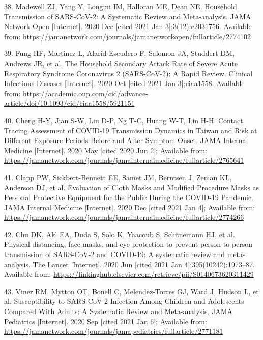 \documentclass[
]{article}
\begin{document}
\leavevmode\hypertarget{ref-madewell_household_2020}{}%
38. Madewell ZJ, Yang Y, Longini IM, Halloran ME, Dean NE. Household
Transmission of SARS-CoV-2: A Systematic Review and Meta-analysis. JAMA
Network Open {[}Internet{]}. 2020 Dec {[}cited 2021 Jan
3{]};3(12):e2031756. Available from:
\url{https://jamanetwork.com/journals/jamanetworkopen/fullarticle/2774102}

\leavevmode\hypertarget{ref-fung_household_2020}{}%
39. Fung HF, Martinez L, Alarid-Escudero F, Salomon JA, Studdert DM,
Andrews JR, et al. The Household Secondary Attack Rate of Severe Acute
Respiratory Syndrome Coronavirus 2 (SARS-CoV-2): A Rapid Review.
Clinical Infectious Diseases {[}Internet{]}. 2020 Oct {[}cited 2021 Jan
3{]};ciaa1558. Available from:
\url{https://academic.oup.com/cid/advance-article/doi/10.1093/cid/ciaa1558/5921151}

\leavevmode\hypertarget{ref-cheng_contact_2020}{}%
40. Cheng H-Y, Jian S-W, Liu D-P, Ng T-C, Huang W-T, Lin H-H. Contact
Tracing Assessment of COVID-19 Transmission Dynamics in Taiwan and Risk
at Different Exposure Periods Before and After Symptom Onset. JAMA
Internal Medicine {[}Internet{]}. 2020 May {[}cited 2020 Jun 2{]};
Available from:
\url{https://jamanetwork.com/journals/jamainternalmedicine/fullarticle/2765641}

\leavevmode\hypertarget{ref-clapp_evaluation_2020}{}%
41. Clapp PW, Sickbert-Bennett EE, Samet JM, Berntsen J, Zeman KL,
Anderson DJ, et al. Evaluation of Cloth Masks and Modified Procedure
Masks as Personal Protective Equipment for the Public During the
COVID-19 Pandemic. JAMA Internal Medicine {[}Internet{]}. 2020 Dec
{[}cited 2021 Jan 4{]}; Available from:
\url{https://jamanetwork.com/journals/jamainternalmedicine/fullarticle/2774266}

\leavevmode\hypertarget{ref-chu_physical_2020}{}%
42. Chu DK, Akl EA, Duda S, Solo K, Yaacoub S, Schünemann HJ, et al.
Physical distancing, face masks, and eye protection to prevent
person-to-person transmission of SARS-CoV-2 and COVID-19: A systematic
review and meta-analysis. The Lancet {[}Internet{]}. 2020 Jun {[}cited
2021 Jan 4{]};395(10242):1973--87. Available from:
\url{https://linkinghub.elsevier.com/retrieve/pii/S0140673620311429}

\leavevmode\hypertarget{ref-viner_susceptibility_2020}{}%
43. Viner RM, Mytton OT, Bonell C, Melendez-Torres GJ, Ward J, Hudson L,
et al. Susceptibility to SARS-CoV-2 Infection Among Children and
Adolescents Compared With Adults: A Systematic Review and Meta-analysis.
JAMA Pediatrics {[}Internet{]}. 2020 Sep {[}cited 2021 Jan 6{]};
Available from:
\url{https://jamanetwork.com/journals/jamapediatrics/fullarticle/2771181}
\end{document}
